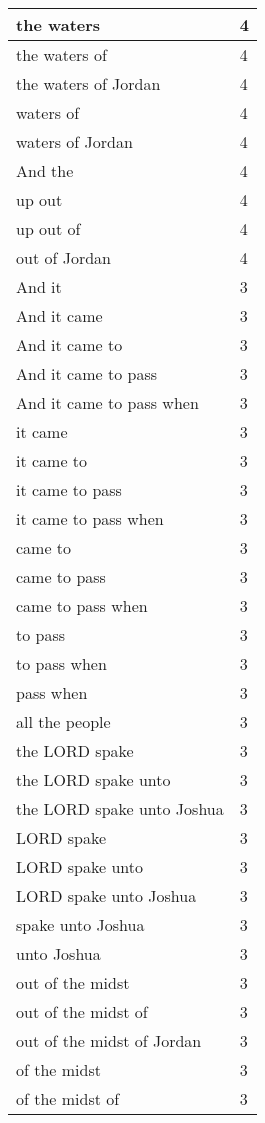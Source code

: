 \begin{center}
\begin{longtable}{|p{3.0in}|p{0.5in}|}
the waters & 4\\ \hline 
the waters of & 4\\ \hline 
the waters of Jordan & 4\\ \hline 
waters of & 4\\ \hline 
waters of Jordan & 4\\ \hline 
And the & 4\\ \hline 
up out & 4\\ \hline 
up out of & 4\\ \hline 
out of Jordan & 4\\ \hline 
And it & 3\\ \hline 
And it came & 3\\ \hline 
And it came to & 3\\ \hline 
And it came to pass & 3\\ \hline 
And it came to pass when & 3\\ \hline 
it came & 3\\ \hline 
it came to & 3\\ \hline 
it came to pass & 3\\ \hline 
it came to pass when & 3\\ \hline 
came to & 3\\ \hline 
came to pass & 3\\ \hline 
came to pass when & 3\\ \hline 
to pass & 3\\ \hline 
to pass when & 3\\ \hline 
pass when & 3\\ \hline 
all the people & 3\\ \hline 
the LORD spake & 3\\ \hline 
the LORD spake unto & 3\\ \hline 
the LORD spake unto Joshua & 3\\ \hline 
LORD spake & 3\\ \hline 
LORD spake unto & 3\\ \hline 
LORD spake unto Joshua & 3\\ \hline 
spake unto Joshua & 3\\ \hline 
unto Joshua & 3\\ \hline 
out of the midst & 3\\ \hline 
out of the midst of & 3\\ \hline 
out of the midst of Jordan & 3\\ \hline 
of the midst & 3\\ \hline 
of the midst of & 3\\ \hline 

\end{longtable}
\end{center}
